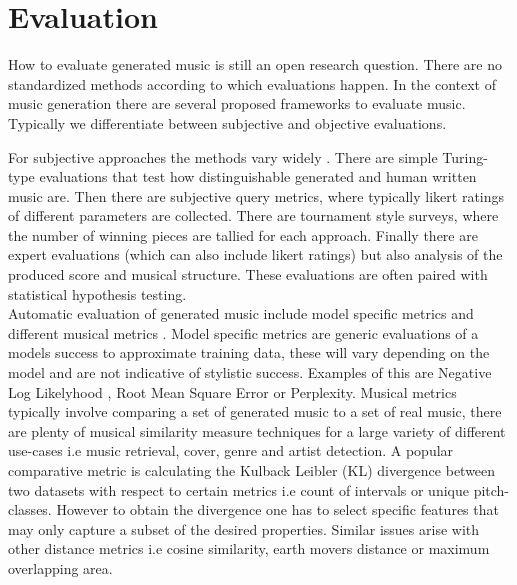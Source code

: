 \section{Evaluation}
How to evaluate generated music is still an open research question. There are no standardized methods according to which evaluations happen\cite{Yin_Reuben_Stepney_Collins_2023}. In the context of music generation there are several proposed frameworks to evaluate music. Typically we differentiate between subjective and objective evaluations.

For subjective approaches the methods vary widely \cite{Xiong_Wang_ai_eval_methods_2023}. There are simple Turing-type evaluations that test how distinguishable generated and human written music are. Then there are subjective query metrics, where typically likert ratings of different parameters are collected.\cite{Min_Jiang_Xia_Zhao_polyffusion_2023}  There are tournament style surveys, where the number of winning pieces are tallied for each approach.\cite{Huang_Vaswani_Uszkoreit_Shazeer_Simon_Hawthorne_Dai_Hoffman_Dinculescu_Eck_2018}\cite{Rütte_figaro_2023} Finally there are expert evaluations (which can also include likert ratings) but also analysis of the produced score and musical structure. \cite{Sturm_Ben-Tal_2016} These evaluations are often paired with statistical hypothesis testing. \cite{Rütte_figaro_2023}\\

Automatic evaluation of generated music include model specific metrics and different musical metrics \cite{Xiong_Wang_ai_eval_methods_2023}. Model specific metrics are generic evaluations of a models success to approximate training data, these will vary depending on the model and are not indicative of stylistic success. Examples of this are Negative Log Likelyhood \cite{Huang_Vaswani_Uszkoreit_Shazeer_Simon_Hawthorne_Dai_Hoffman_Dinculescu_Eck_2018}, Root Mean Square Error \cite{Rütte_figaro_2023} or Perplexity\cite{Rütte_figaro_2023}. Musical metrics typically involve comparing a set of generated music to a set of real music, there are plenty of musical similarity measure techniques\cite{Gurjar_Moon_similarity_2018} for a large variety of different use-cases i.e music retrieval, cover, genre and artist detection. A popular comparative metric is calculating the Kulback Leibler (KL) divergence between two datasets with respect to certain metrics i.e count of intervals or unique pitch-classes. However to obtain the divergence one has to select specific features that may only capture a subset of the desired properties. Similar issues arise with other distance metrics i.e cosine similarity, earth movers distance or maximum overlapping area. 

